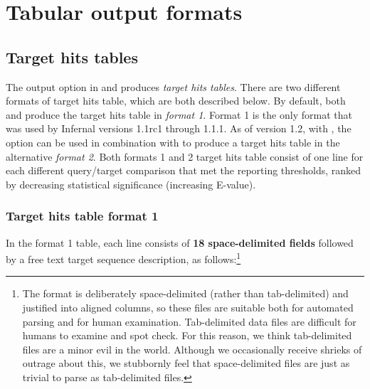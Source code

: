 \section{Tabular output formats}
\label{section:tabular}
\setcounter{footnote}{0}

\subsection{Target hits tables}

The  output option in  and
 produces \emph{target hits tables}. There are two
different formats of target hits table, which are both described
below. By default, both  and  produce the
target hits table in \emph{format 1}. Format 1 is the only format that
was used by Infernal versions 1.1rc1 through 1.1.1. As of version 1.2,
with , the  option can be used in
combination with  to produce a target hits table in
the alternative \emph{format 2}.  Both formats 1 and 2 target hits
table consist of one line for each different query/target comparison
that met the reporting thresholds, ranked by decreasing statistical
significance (increasing E-value).

\subsubsection{Target hits table format 1}

In the format 1 table, each line
consists of \textbf{18 space-delimited fields} followed by a free text
target sequence description, as follows:\footnote{The 
  format is deliberately space-delimited (rather than tab-delimited)
  and justified into aligned columns, so these files are suitable both
  for automated parsing and for human examination. Tab-delimited data
  files are difficult for humans to examine and spot check. For this
  reason, we think tab-delimited files are a minor evil in the
  world. Although we occasionally receive shrieks of outrage about
  this, we stubbornly feel that space-delimited files are just as
  trivial to parse as tab-delimited files.}

